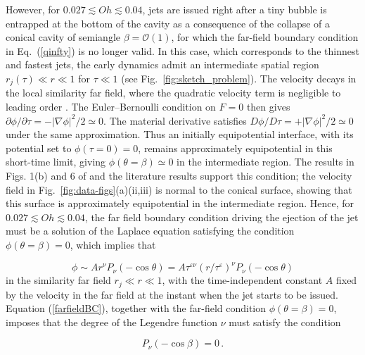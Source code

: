 \documentclass[aps,prl,reprint,floatfix]{revtex4-2}
\begin{document}
However, for $0.027 \lesssim Oh \lesssim 0.04$, jets are issued right after a tiny bubble is entrapped at the bottom of the cavity as a consequence of the collapse of a conical cavity of semiangle $\beta=\mathcal{O}(1)$, for which the far-field boundary condition in Eq.~(\ref{qinfty}) is no longer valid. In this case, which corresponds to the thinnest and fastest jets, the early dynamics admit an intermediate spatial region $r_j(\tau)\ll r\ll1$ for $\tau\ll1$ (see Fig.~\ref{fig:sketch_problem}). The velocity decays in the local similarity far field, where the quadratic velocity term is negligible to leading order \cite{wagner1932}. The Euler--Bernoulli condition on $F=0$ then gives $\partial\phi/\partial\tau=-|\nabla\phi|^2/2\simeq0$. The material derivative satisfies $D\phi/D\tau=+|\nabla\phi|^2/2\simeq0$ under the same approximation. Thus an initially equipotential interface, with its potential set to $\phi(\tau=0)=0$, remains approximately equipotential in this short-time limit, giving $\phi(\theta=\beta)\simeq0$ in the intermediate region. The results in Figs. 1(b) and 6 of \cite{JFMGanan} and the literature results support this condition; the velocity field in Fig.~\ref{fig:data-figs}(a)(ii,iii) is normal to the conical surface, showing that this surface is approximately equipotential in the intermediate region. Hence, for $0.027\lesssim Oh\lesssim 0.04$, the far field boundary condition driving the ejection of the jet must be a solution of the Laplace equation satisfying the condition $\phi(\theta=\beta)=0$, which implies that

\begin{equation}
\phi\sim A r^\nu P_\nu(-\cos\theta)=A \tau^{\varepsilon \nu}\left(r/\tau^\varepsilon\right)^\nu P_\nu(-\cos\theta) \label{farfieldBC}
\end{equation}
in the similarity far field $r_j\ll r\ll1$, with the time-independent constant $A$ fixed by the velocity in the far field at the instant when the jet starts to be issued. Equation (\ref{farfieldBC}), together with the far-field condition $\phi(\theta = \beta) = 0$, imposes that the degree of the Legendre function $\nu$ must satisfy the condition

\begin{equation}
P_\nu(-\cos\beta)=0\, .\label{condition}
\end{equation}
\end{document}
